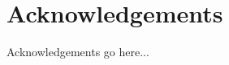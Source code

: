 \documentclass[bookType,partialBuild]{../ThesisClass/ThesisClass}
\begin{document}
\fi
\ifdefined \bookType
	\cleardoublepage
\fi



\chapter*{Acknowledgements}


Acknowledgements go here...

\vspace{1cm}



\ifdefined \partialBuild
	
\end{document}
